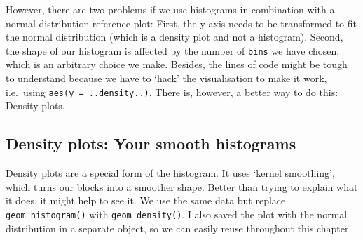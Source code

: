 \documentclass[
  letterpaper,
]{krantz}
\makeatletter
\newenvironment{Shaded}{\begin{snugshade}}{\end{snugshade}}
\newcommand{\AttributeTok}[1]{\textcolor[rgb]{0.40,0.45,0.13}{#1}}
\newcommand{\CommentTok}[1]{\textcolor[rgb]{0.37,0.37,0.37}{#1}}
\newcommand{\DecValTok}[1]{\textcolor[rgb]{0.68,0.00,0.00}{#1}}
\newcommand{\FunctionTok}[1]{\textcolor[rgb]{0.28,0.35,0.67}{#1}}
\newcommand{\NormalTok}[1]{\textcolor[rgb]{0.00,0.23,0.31}{#1}}
\newcommand{\OtherTok}[1]{\textcolor[rgb]{0.00,0.23,0.31}{#1}}
\newcommand{\SpecialCharTok}[1]{\textcolor[rgb]{0.37,0.37,0.37}{#1}}
\newcommand{\StringTok}[1]{\textcolor[rgb]{0.13,0.47,0.30}{#1}}
\newenvironment{kframe}{%
\medskip{}
\setlength{\fboxsep}{.8em}
 \def\at@end@of@kframe{}%
 \ifinner\ifhmode%
  \def\at@end@of@kframe{\end{minipage}}%
  \begin{minipage}{\columnwidth}%
 \fi\fi%
 \def\FrameCommand##1{\hskip\@totalleftmargin \hskip-\fboxsep
 \colorbox{shadecolor}{##1}\hskip-\fboxsep
     \hskip-\linewidth \hskip-\@totalleftmargin \hskip\columnwidth}%
 \MakeFramed {\advance\hsize-\width
   \@totalleftmargin\z@ \linewidth\hsize
   \@setminipage}}%
 {\par\unskip\endMakeFramed%
 \at@end@of@kframe}
\renewenvironment{Shaded}{\begin{kframe}}{\end{kframe}}
\makeatother
\begin{document}
However, there are two problems if we use histograms in combination with
a normal distribution reference plot: First, the y-axis needs to be
transformed to fit the normal distribution (which is a density plot and
not a histogram). Second, the shape of our histogram is affected by the
number of \texttt{bins} we have chosen, which is an arbitrary choice we
make. Besides, the lines of code might be tough to understand because we
have to `hack' the visualisation to make it work, i.e.~using
\texttt{aes(y\ =\ ..density..)}. There is, however, a better way to do
this: Density plots.

\subsection{Density plots: Your smooth
histograms}\label{density-plots-your-smooth-histograms}

Density plots are a special form of the histogram. It uses `kernel
smoothing', which turns our blocks into a smoother shape. Better than
trying to explain what it does, it might help to see it. We use the same
data but replace \texttt{geom\_histogram()} with
\texttt{geom\_density()}. I also saved the plot with the normal
distribution in a separate object, so we can easily reuse throughout
this chapter.

\begin{Shaded}
\end{Shaded}
\end{document}
